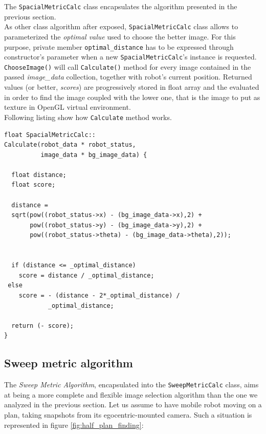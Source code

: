 The \texttt{SpacialMetricCalc} class encapsulates the 
algorithm presented in the previous section.
\\
As other class algorithm after exposed, \texttt{SpacialMetricCalc}
class allows to parameterized the \textit{optimal value} used to
choose the better image. For this purpose, private member
\texttt{optimal\_distance} has to be expressed through constructor's
parameter when a new \texttt{SpacialMetricCalc}'s instance
is requested.
\texttt{ChooseImage()} will call \texttt{Calculate()}
method for every image contained in the passed \textit{image\_data}
collection, together with robot's current position.
Returned values (or better, \textit{scores}) are
progressively stored in float array and the evaluated in order
to find the image coupled with the lower one, that is the image
to put as texture in OpenGL virtual environment.
\\
Following listing show how \texttt{Calculate} method works.
\\
\begin{lstlisting}[caption={\texttt{SpacialMetricCalc::Calculate} method},
    label={code:spacialmetriccalc:calculate}]
float SpacialMetricCalc::
Calculate(robot_data * robot_status,
          image_data * bg_image_data) {

  float distance;
  float score;

  distance = 
  sqrt(pow((robot_status->x) - (bg_image_data->x),2) +
       pow((robot_status->y) - (bg_image_data->y),2) +
       pow((robot_status->theta) - (bg_image_data->theta),2));


  if (distance <= _optimal_distance)
    score = distance / _optimal_distance;
 else
    score = - (distance - 2*_optimal_distance) /
            _optimal_distance;

  return (- score);
}
\end{lstlisting}


\subsection{Sweep metric algorithm}
\label{concr:iimageselector:sweep_metric_algorithm}

The  \textit{Sweep Metric Algorithm}, encapsulated into the 
\texttt{SweepMetricCalc} class, aims at being a more 
complete and flexible image selection algorithm than the one 
we analyzed in the previous section.
Let us assume to have  mobile robot moving on a plan, 
taking snapshots from its egocentric-mounted camera.
Such a situation is represented in figure 
\ref{fig:half_plan_finding}:

